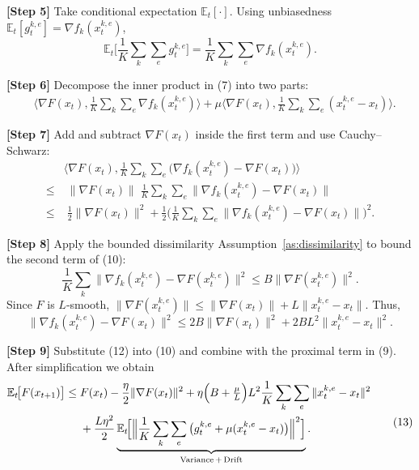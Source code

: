 \documentclass[11pt]{article}
\begin{document}
\noindent\textbf{[Step 5]} Take conditional expectation $\mathbb{E}_t[\cdot]$.
Using unbiasedness $\mathbb{E}_t[g_{t}^{k,e}]=\nabla f_k(x_{t}^{k,e})$,
\[
\mathbb{E}_t\Big[\frac1K\sum_{k}\sum_{e} g_{t}^{k,e}\Big]
= \frac1K\sum_{k}\sum_{e}\nabla f_k(x_{t}^{k,e}).
\tag{8}
\]

\noindent\textbf{[Step 6]} Decompose the inner product in (7) into two parts:
\[
\begin{aligned}
&\Big\langle\nabla F(x_t),\frac1K\sum_{k}\sum_{e}\nabla f_k(x_{t}^{k,e})\Big\rangle
+ \mu\Big\langle\nabla F(x_t),\frac1K\sum_{k}\sum_{e}(x_{t}^{k,e}-x_t)\Big\rangle .
\end{aligned}
\tag{9}
\]

\noindent\textbf{[Step 7]} Add and subtract $\nabla F(x_t)$ inside the first term and use Cauchy–Schwarz:
\[
\begin{aligned}
&\Big\langle\nabla F(x_t),\frac1K\sum_{k}\sum_{e}\big(\nabla f_k(x_{t}^{k,e})-\nabla F(x_t)\big)\Big\rangle
\\
\le &\;\|\nabla F(x_t)\|\;\frac1K\sum_{k}\sum_{e}\|\nabla f_k(x_{t}^{k,e})-\nabla F(x_t)\|
\\
\le &\;\frac12\|\nabla F(x_t)\|^{2}
     +\frac12\Big(\frac1K\sum_{k}\sum_{e}\|\nabla f_k(x_{t}^{k,e})-\nabla F(x_t)\|\Big)^{2}.
\end{aligned}
\tag{10}
\]

\noindent\textbf{[Step 8]} Apply the bounded dissimilarity Assumption~\ref{as:dissimilarity} to bound the second term of (10):
\[
\frac1K\sum_{k}\|\nabla f_k(x_{t}^{k,e})-\nabla F(x_{t}^{k,e})\|^{2}
\le B\|\nabla F(x_{t}^{k,e})\|^{2}.
\tag{11}
\]
Since $F$ is $L$‑smooth,
$\|\nabla F(x_{t}^{k,e})\|\le \|\nabla F(x_t)\|+L\|x_{t}^{k,e}-x_t\|$.
Thus,
\[
\|\nabla f_k(x_{t}^{k,e})-\nabla F(x_t)\|^{2}
\le 2B\|\nabla F(x_t)\|^{2}+2BL^{2}\|x_{t}^{k,e}-x_t\|^{2}.
\tag{12}
\]

\noindent\textbf{[Step 9]} Substitute (12) into (10) and combine with the proximal term in (9). After simplification we obtain
\[
\begin{aligned}
\mathbb{E}_t\!\big[F(x_{t+1})\big]
\le &\;F(x_t)-\frac{\eta}{2}\|\nabla F(x_t)\|^{2}
      +\eta\Big(B+\tfrac{\mu}{L}\Big)L^{2}\frac1K\sum_{k}\sum_{e}\|x_{t}^{k,e}-x_t\|^{2}\\
      &\;+\frac{L\eta^{2}}{2}\underbrace{\mathbb{E}_t\!\Big[\Big\|\frac1K\sum_{k}\sum_{e}\big(g_{t}^{k,e}+\mu (x_{t}^{k,e}-x_t)\big)\Big\|^{2}\Big]}_{\text{Variance\,+\,Drift}} .
\end{aligned}
\tag{13}
\]
\end{document}
